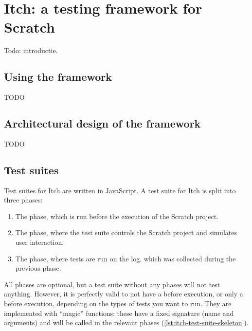 \documentclass[../main]{subfiles}
\begin{document}
\chapter{Itch: a testing framework for Scratch}\label{ch:itch}

Todo: introductie.

\section{Using the framework}\label{sec:itch-using-the-framework}

TODO

\section{Architectural design of the framework}\label{sec:itch-architecture}

TODO

\section{Test suites}\label{sec:itch-test-suites}

Test suites for Itch are written in JavaScript.
A test suite for Itch is split into three phases:

\begin{enumerate}
    \item The  phase, which is run before the execution of the Scratch project.
    \item The  phase, where the test suite controls the Scratch project and simulates user interaction.
    \item The  phase, where tests are run on the log, which was collected during the previous phase.
\end{enumerate}

All phases are optional, but a test suite without any phases will not test anything.
However, it is perfectly valid to not have a before execution, or only a before execution, depending on the types of tests you want to run.
They are implemented with ``magic'' functions: these have a fixed signature (name and arguments) and will be called in the relevant phases (\cref{lst:itch-test-suite-skeleton}).
\end{document}
